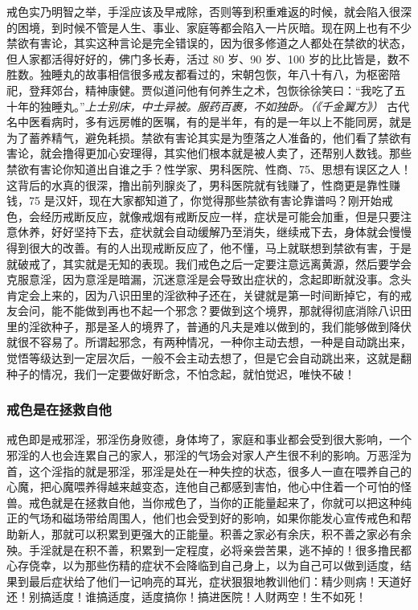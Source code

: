 戒色实乃明智之举，手淫应该及早戒除，否则等到积重难返的时候，就会陷入很深的困境，到时候不管是人生、事业、家庭等都会陷入一片灰暗。现在网上也有不少禁欲有害论，其实这种言论是完全错误的，因为很多修道之人都处在禁欲的状态，但人家都活得好好的，佛门多长寿，活过 80 岁、90 岁、100 岁的比比皆是，数不胜数。独睡丸的故事相信很多戒友都看过的，宋朝包恢，年八十有八，为枢密陪祀，登拜郊台，精神康健。贾似道问他有何养生之术，包恢徐徐笑曰：“我吃了五十年的独睡丸。”\textit{上士别床，中士异被。服药百裹，不如独卧。（《千金翼方》）} 古代名中医看病时，多有远房帷的医嘱，有的是半年，有的是一年以上不能同房，就是为了蓄养精气，避免耗损。禁欲有害论其实是为堕落之人准备的，他们看了禁欲有害论，就会撸得更加心安理得，其实他们根本就是被人卖了，还帮别人数钱。那些禁欲有害论你知道出自谁之手？性学家、男科医院、性商、75、思想有误区之人！这背后的水真的很深，撸出前列腺炎了，男科医院就有钱赚了，性商更是靠性赚钱，75 是汉奸，现在大家都知道了，你觉得那些禁欲有害论靠谱吗？刚开始戒色，会经历戒断反应，就像戒烟有戒断反应一样，症状是可能会加重，但是只要注意休养，好好坚持下去，症状就会自动缓解乃至消失，继续戒下去，身体就会慢慢得到很大的改善。有的人出现戒断反应了，他不懂，马上就联想到禁欲有害，于是就破戒了，其实就是无知的表现。我们戒色之后一定要注意远离黄源，然后要学会克服意淫，因为意淫是暗漏，沉迷意淫是会导致出症状的，念起即断就没事。念头肯定会上来的，因为八识田里的淫欲种子还在，关键就是第一时间断掉它，有的戒友会问，能不能做到再也不起一个邪念？要做到这个境界，那就得彻底消除八识田里的淫欲种子，那是圣人的境界了，普通的凡夫是难以做到的，我们能够做到降伏就很不容易了。所谓起邪念，有两种情况，一种你主动去想，一种是自动跳出来，觉悟等级达到一定层次后，一般不会主动去想了，但是它会自动跳出来，这就是翻种子的情况，我们一定要做好断念，不怕念起，就怕觉迟，唯快不破！

\subsubsection{戒色是在拯救自他}

戒色即是戒邪淫，邪淫伤身败德，身体垮了，家庭和事业都会受到很大影响，一个邪淫的人也会连累自己的家人，邪淫的气场会对家人产生很不利的影响。万恶淫为首，这个淫指的就是邪淫，邪淫是处在一种失控的状态，很多人一直在喂养自己的心魔，把心魔喂养得越来越变态，连他自己都感到害怕，他心中住着一个可怕的怪兽。戒色就是在拯救自他，当你戒色了，当你的正能量起来了，你就可以把这种纯正的气场和磁场带给周围人，他们也会受到好的影响，如果你能发心宣传戒色和帮助新人，那就可以积累到更强大的正能量。积善之家必有余庆，积不善之家必有余殃。手淫就是在积不善，积累到一定程度，必将亲尝苦果，逃不掉的！很多撸民都心存侥幸，以为那些伤精的症状不会降临到自己身上，以为自己可以做到适度，结果到最后症状给了他们一记响亮的耳光，症状狠狠地教训他们：精少则病！天道好还！别搞适度！谁搞适度，适度搞你！搞进医院！人财两空！生不如死！

